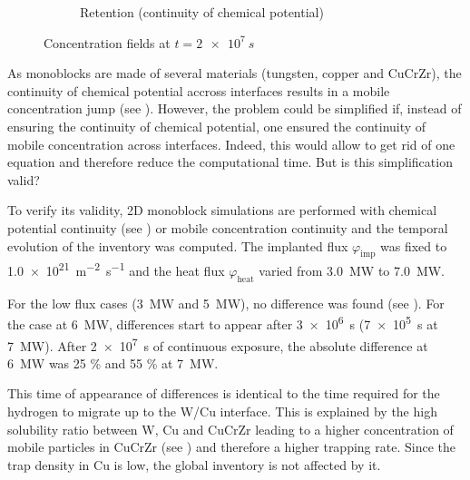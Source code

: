 \begin{figure}
\begin{subfigure}{0.5\linewidth}
        \caption{Retention (continuity of chemical potential)}
    \end{subfigure}
    \caption{Concentration fields at $t=\SI{2e7}{s}$}
\end{figure}

As monoblocks are made of several materials (tungsten, copper and CuCrZr), the continuity of chemical potential accross interfaces results in a mobile concentration jump (see ).
However, the problem could be simplified if, instead of ensuring the continuity of chemical potential, one ensured the continuity of mobile concentration across interfaces.
Indeed, this would allow to get rid of one equation and therefore reduce the computational time.
But is this simplification valid?

To verify its validity, 2D monoblock simulations are performed with chemical potential continuity (see ) or mobile concentration continuity and the temporal evolution of the inventory was computed.
The implanted flux $\varphi_\mathrm{imp}$ was fixed to \SI{1.0e21}{m^{-2}.s^{-1}} and the heat flux $\varphi_\mathrm{heat}$ varied from \SI{3.0}{MW} to \SI{7.0}{MW}.

For the low flux cases (\SI{3}{MW} and \SI{5}{MW}), no difference was found (see ).
For the case at \SI{6}{MW}, differences start to appear after \SI{3e6}{s} (\SI{7e5}{s} at \SI{7}{MW}).
After \SI{2e7}{s} of continuous exposure, the absolute difference at \SI{6}{MW} was 25 \% and 55 \% at \SI{7}{MW}.

This time of appearance of differences is identical to the time required for the hydrogen to migrate up to the W/Cu interface.
This is explained by the high solubility ratio between W, Cu and CuCrZr leading to a higher concentration of mobile particles in CuCrZr (see ) and therefore a higher trapping rate.
Since the trap density in Cu is low, the global inventory is not affected by it.


